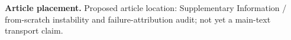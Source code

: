 \textbf{Article placement.} Proposed article location: Supplementary Information / from-scratch instability and failure-attribution audit; not yet a main-text transport claim.
